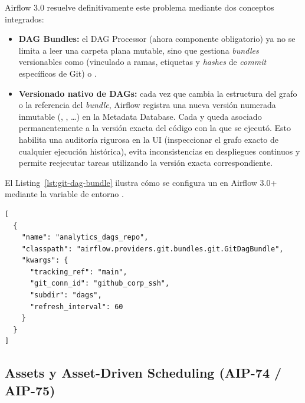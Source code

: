 Airflow 3.0 resuelve definitivamente este problema mediante dos conceptos integrados:
\begin{itemize}
  \item \textbf{DAG Bundles:} el DAG Processor (ahora componente obligatorio) ya no se limita a leer una carpeta plana mutable, sino que gestiona \textit{bundles} versionables como  (vinculado a ramas, etiquetas y \textit{hashes} de \textit{commit} específicos de Git) o .
  \item \textbf{Versionado nativo de DAGs:} cada vez que cambia la estructura del grafo o la referencia del \textit{bundle}, Airflow registra una nueva versión numerada inmutable (, , \ldots) en la Metadata Database. Cada  y  queda asociado permanentemente a la versión exacta del código con la que se ejecutó. Esto habilita una auditoría rigurosa en la UI (inspeccionar el grafo exacto de cualquier ejecución histórica), evita inconsistencias en despliegues continuos y permite reejecutar tareas utilizando la versión exacta correspondiente.
\end{itemize}

El Listing~\ref{lst:git-dag-bundle} ilustra cómo se configura un  en Airflow 3.0+ mediante la variable de entorno .

\begin{lstlisting}[style=json, caption={Configuración de \texttt{GitDagBundle} en Airflow 3.0+ para sincronización y versionado inmutable de DAGs desde Git.}, label={lst:git-dag-bundle}]
[
  {
    "name": "analytics_dags_repo",
    "classpath": "airflow.providers.git.bundles.git.GitDagBundle",
    "kwargs": {
      "tracking_ref": "main",
      "git_conn_id": "github_corp_ssh",
      "subdir": "dags",
      "refresh_interval": 60
    }
  }
]
\end{lstlisting}

\subsection{Assets y Asset-Driven Scheduling (AIP-74 / AIP-75)}\label{subsec:assets-airflow3}

